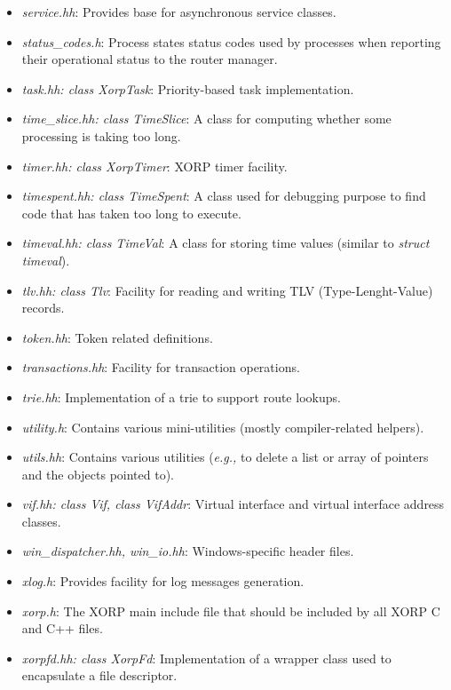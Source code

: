 \documentclass[11pt]{article}
\newcommand{\eg}{\emph{e.g.,}\xspace}
\begin{document}
\begin{itemize}
  \item \emph{service.hh}: Provides base for asynchronous service classes.

  \item \emph{status\_codes.h}: Process states status codes used by
  processes when reporting their operational status to the router
  manager.

  \item \emph{task.hh: class XorpTask}: Priority-based task implementation.

  \item \emph{time\_slice.hh: class TimeSlice}: A class for computing
  whether some processing is taking too long.

  \item \emph{timer.hh: class XorpTimer}: XORP timer facility.

  \item \emph{timespent.hh: class TimeSpent}: A class used for debugging
  purpose to find code that has taken too long to execute.

  \item \emph{timeval.hh: class TimeVal}: A class for storing time values
  (similar to \emph{struct timeval}).

  \item \emph{tlv.hh: class Tlv}: Facility for reading and writing TLV
  (Type-Lenght-Value) records.

  \item \emph{token.hh}: Token related definitions.

  \item \emph{transactions.hh}: Facility for transaction operations.

  \item \emph{trie.hh}: Implementation of a trie to support route
  lookups.

  \item \emph{utility.h}: Contains various mini-utilities
  (mostly compiler-related helpers).

  \item \emph{utils.hh}: Contains various utilities (\eg to delete a
  list or array of pointers and the objects pointed to).

  \item \emph{vif.hh: class Vif, class VifAddr}: Virtual interface and
  virtual interface address classes.

  \item \emph{win\_dispatcher.hh, win\_io.hh}: Windows-specific header
  files.

  \item \emph{xlog.h}: Provides facility for log messages generation.

  \item \emph{xorp.h}: The XORP main include file that should be included
  by all XORP C and C++ files.

  \item \emph{xorpfd.hh: class XorpFd}: Implementation of a wrapper
  class used to encapsulate a file descriptor.

\end{itemize}
\end{document}
